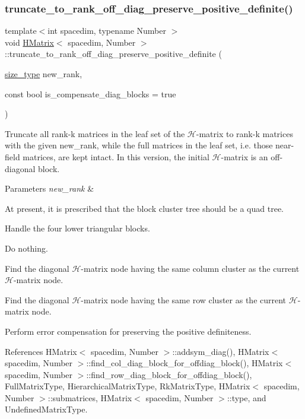 \subsubsection{\texorpdfstring{truncate\+\_\+to\+\_\+rank\+\_\+off\+\_\+diag\+\_\+preserve\+\_\+positive\+\_\+definite()}{truncate\_to\_rank\_off\_diag\_preserve\_positive\_definite()}}
{\footnotesize\ttfamily template$<$int spacedim, typename Number $>$ \\
void \hyperlink{classHMatrix}{H\+Matrix}$<$ spacedim, Number $>$\+::truncate\+\_\+to\+\_\+rank\+\_\+off\+\_\+diag\+\_\+preserve\+\_\+positive\+\_\+definite (\begin{DoxyParamCaption}\item[{\hyperlink{classHMatrix_a5ca8dc549783d38371a01ecd621ecb34}{size\+\_\+type}}]{new\+\_\+rank,  }\item[{const bool}]{is\+\_\+compensate\+\_\+diag\+\_\+blocks = {\ttfamily true} }\end{DoxyParamCaption})}

Truncate all rank-\/k matrices in the leaf set of the $\mathcal{H}$-\/matrix to rank-\/k matrices with the given {\ttfamily new\+\_\+rank}, while the full matrices in the leaf set, i.\+e. those near-\/field matrices, are kept intact. In this version, the initial $\mathcal{H}$-\/matrix is an off-\/diagonal block.


\begin{DoxyParams}{Parameters}
{\em new\+\_\+rank} & \\
\hline
\end{DoxyParams}
At present, it is prescribed that the block cluster tree should be a quad tree.

Handle the four lower triangular blocks.

Do nothing.

Find the diagonal $\mathcal{H}$-\/matrix node having the same column cluster as the current $\mathcal{H}$-\/matrix node.

Find the diagonal $\mathcal{H}$-\/matrix node having the same row cluster as the current $\mathcal{H}$-\/matrix node.

Perform error compensation for preserving the positive definiteness.

References H\+Matrix$<$ spacedim, Number $>$\+::addsym\+\_\+diag(), H\+Matrix$<$ spacedim, Number $>$\+::find\+\_\+col\+\_\+diag\+\_\+block\+\_\+for\+\_\+offdiag\+\_\+block(), H\+Matrix$<$ spacedim, Number $>$\+::find\+\_\+row\+\_\+diag\+\_\+block\+\_\+for\+\_\+offdiag\+\_\+block(), Full\+Matrix\+Type, Hierarchical\+Matrix\+Type, Rk\+Matrix\+Type, H\+Matrix$<$ spacedim, Number $>$\+::submatrices, H\+Matrix$<$ spacedim, Number $>$\+::type, and Undefined\+Matrix\+Type.


